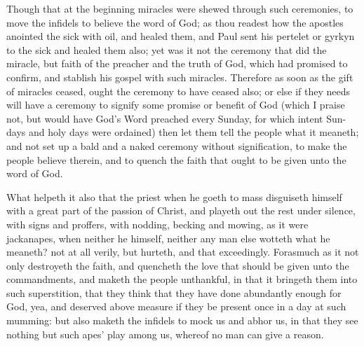 \documentclass{custom}
\begin{document}
Though that at the beginning miracles were shewed 
through such ceremonies, to move the infidels to believe 
the word of God; as thou readest how the apostles 
anointed the sick with oil, and healed them, and Paul sent 
his pertelet or gyrkyn to the sick and healed them also; 
yet was it not the ceremony that did the miracle, but 
faith of the preacher and the truth of God, which had 
promised to confirm, and stablish his gospel with such 
miracles. Therefore as soon as the gift of miracles 
ceased, ought the ceremony to have ceased also; or else if 
they needs will have a ceremony to signify some promise 
or benefit of God (which I praise not, but would have 
God's Word preached every Sunday, for which intent Sun- 
days and holy days were ordained) then let them tell the 
people what it meaneth; and not set up a bald and a 
naked ceremony without signification, to make the people 
believe therein, and to quench the faith that ought to be 
given unto the word of God. 

What helpeth it also that the priest when he goeth to 
mass disguiseth himself with a great part of the passion 
of Christ, and playeth out the rest under silence, with 
signs and proffers, with nodding, becking and mowing, 
as it were jackanapes, when neither he himself, neither any 
man else wotteth what he meaneth? not at all verily, but 
hurteth, and that exceedingly. Forasmuch as it not only 
destroyeth the faith, and quencheth the love that should be 
given unto the commandments, and maketh the people 
unthankful, in that it bringeth them into such superstition, 
that they think that they have done abundantly enough for 
God, yea, and deserved above measure if they be present 
once in a day at such mumming: but also maketh the 
infidels to mock us and abhor us, in that they see nothing 
but such apes' play among us, whereof no man can give 
a reason. 
\end{document}
